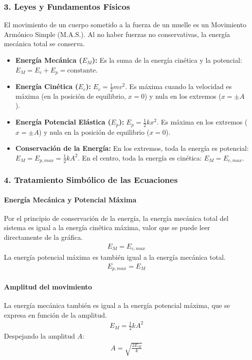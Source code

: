 \subsubsection*{3. Leyes y Fundamentos Físicos}
El movimiento de un cuerpo sometido a la fuerza de un muelle es un Movimiento Armónico Simple (M.A.S.). Al no haber fuerzas no conservativas, la energía mecánica total se conserva.
\begin{itemize}
    \item \textbf{Energía Mecánica ($E_M$):} Es la suma de la energía cinética y la potencial: $E_M = E_c + E_p = \text{constante}$.
    \item \textbf{Energía Cinética ($E_c$):} $E_c = \frac{1}{2}mv^2$. Es máxima cuando la velocidad es máxima (en la posición de equilibrio, $x=0$) y nula en los extremos ($x=\pm A$).
    \item \textbf{Energía Potencial Elástica ($E_p$):} $E_p = \frac{1}{2}kx^2$. Es máxima en los extremos ($x=\pm A$) y nula en la posición de equilibrio ($x=0$).
    \item \textbf{Conservación de la Energía:} En los extremos, toda la energía es potencial: $E_M = E_{p,max} = \frac{1}{2}kA^2$. En el centro, toda la energía es cinética: $E_M = E_{c,max}$.
\end{itemize}

\subsubsection*{4. Tratamiento Simbólico de las Ecuaciones}
\paragraph{Energía Mecánica y Potencial Máxima}
Por el principio de conservación de la energía, la energía mecánica total del sistema es igual a la energía cinética máxima, valor que se puede leer directamente de la gráfica.
\begin{gather}
    E_M = E_{c,max}
\end{gather}
La energía potencial máxima es también igual a la energía mecánica total.
\begin{gather}
    E_{p,max} = E_M
\end{gather}

\paragraph{Amplitud del movimiento}
La energía mecánica también es igual a la energía potencial máxima, que se expresa en función de la amplitud.
\begin{gather}
    E_M = \frac{1}{2}kA^2
\end{gather}
Despejando la amplitud $A$:
\begin{gather}
    A = \sqrt{\frac{2E_M}{k}}
\end{gather}

